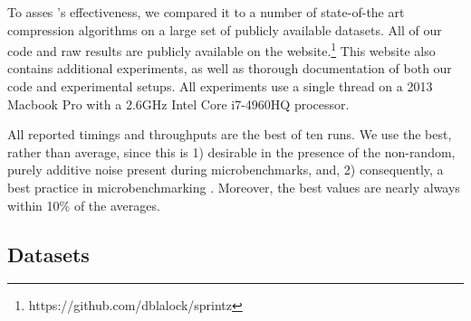 

To asses \mine's effectiveness, we compared it to a number of state-of-the art compression algorithms on a large set of publicly available datasets. All of our code and raw results are publicly available on the \minesp website.\footnote{https://github.com/dblalock/sprintz} This website also contains additional experiments, as well as thorough documentation of both our code and experimental setups. All experiments use a single thread on a 2013 Macbook Pro with a 2.6GHz Intel Core i7-4960HQ processor.

All reported timings and throughputs are the best of ten runs. We use the best, rather than average, since this is 1) desirable in the presence of the non-random, purely additive noise present during microbenchmarks, and, 2) consequently, a best practice in microbenchmarking \cite{lemireMicrobenchmark}. Moreover, the best values are nearly always within 10\% of the averages.

\subsection{Datasets}

